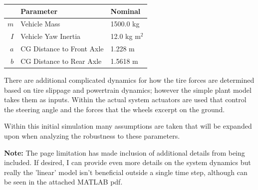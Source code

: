 \documentclass[]{article}
\begin{document}
    \begin{tabular}{|r|l|l|}
        \hline
            & Parameter & Nominal\\
        \hline
        $m$ & Vehicle Mass & 1500.0 kg\\
        \hline
        $I$ & Vehicle Yaw Inertia & 12.0 kg m$^2$\\
        \hline
        $a$ & CG Distance to Front Axle & 1.228 m\\
        \hline
        $b$ & CG Distance to Rear Axle & 1.5618 m\\
        \hline
    \end{tabular}

There are additional complicated dynamics for how the tire forces are determined based on tire slippage and powertrain dynamics; however the simple plant model takes them as inputs.
Within the actual system actuators are used that control the steering angle and the forces that the wheels excerpt on the ground.

Within this initial simulation many assumptions are taken that will be expanded upon when analyzing the robustness to these parameters.

\textbf{Note:} 
The page limitation has made inclusion of additional details from being included. 
If desired, I can provide even more details on the system dynamics but really the 'linear' model isn't beneficial outside a single time step, although can be seen in the attached MATLAB pdf.




\end{document}
